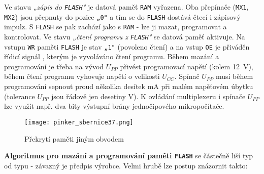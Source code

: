       Ve stavu \emph{„zápis do \texttt{FLASH}"} je datová paměť \texttt{RAM} vyřazena. Oba 
      přepínače (\texttt{MX1}, \texttt{MX2}) jsou přepnuty do pozice \texttt{„0"} a tím se do 
      \texttt{FLASH} dostává čtecí i zápisový impulz. S \texttt{FLASH} se pak zachází jako s 
      \texttt{RAM} - lze ji mazat, programovat a kontrolovat. Ve stavu \emph{„čtení programu z 
      \texttt{FLASH}"} se datová paměť aktivuje. Na vstupu \texttt{WR} paměti \texttt{FLASH} je 
      stav \texttt{„1"} (povoleno čtení) a na vstup \texttt{OE} je přiváděn řídicí signál 
      , kterým je vyvoláváno čtení programu. Během mazání a 
      programování je třeba na vývod \(U_{PP}\) přivést programovací napětí (kolem 
      \qty{12}{\volt}), během čtení programu vyhovuje napětí o velikosti \(U_{CC}\). Spínač 
      \(U_{PP}\) musí během programování sepnout proud několika desítek mA při malém napěťovém 
      úbytku (tolerance \(U_{PP}\) jsou řádově jen desetiny V). K ovládání multiplexeru i spínače 
      \(U_{PP}\) lze využít např. dva bity výstupní brány jednočipového mikropočítače.
      
      \begin{figure}[ht!] %
        \centering
        \texttt{[image: pinker\_sbernice37.png]}
        \caption{Překrytí paměti jiným obvodem}
        \label{MIT:fig_sbernice37}
      \end{figure}
      
      \textbf{Algoritmus pro mazání a programování paměti \texttt{FLASH}} se částečně liší typ od 
      typu - závazný je předpis výrobce. Velmi hrubě lze postup znázornit takto:
      

